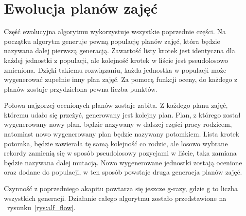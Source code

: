 \section{Ewolucja planów zajęć}

    Część ewolucyjna algorytmu wykorzystuje wszystkie poprzednie części. Na początku algorytm generuje pewną populację planów zajęć, która będzie nazywana dalej pierwszą generacją. Zawartość listy krotek jest identyczna dla każdej jednostki z populacji, ale kolejność krotek w liście jest pseudolosowo zmieniona. Dzięki takiemu rozwiązaniu, każda jednostka w populacji może wygenerować zupełnie inny plan zajęć. Za pomocą funkcji oceny, do każdego z planów zostaje przydzielona pewna liczba punktów. 

Połowa najgorzej ocenionych planów zostaje zabita. Z każdego planu zajęć, któremu udało się przeżyć, generowany jest kolejny plan. Plan, z którego został wygenerowany nowy plan, będzie nazywany w dalszej części pracy rodzicem, natomiast nowo wygenerowany plan będzie nazywany potomkiem. Lista krotek potomka, będzie zawierała tę samą kolejność co rodzic, ale losowo wybrane rekordy zamienią się w sposób pseudolosowy pozycjami w liście, taka zamiana będzie nazywana dalej mutacją. Nowo wygenerowane jednostki zostają ocenione oraz dodane do populacji, w ten sposób powstaje druga generacja planów zajęć.

    Czynność z poprzedniego akapitu powtarza się jeszcze g-razy, gdzie g to liczba wszystkich generacji. Działanie całego algorytmu zostało przedstawione na ~rysunku~\ref{rys:alf_flow}.



